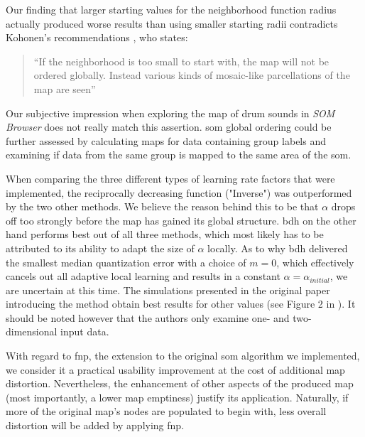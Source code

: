 \smallskip

Our finding that larger starting values for the neighborhood function radius
actually produced worse results than using smaller starting radii contradicts
Kohonen's recommendations \citep{kohonen1990}, who states:

\begin{quotation}
“If the neighborhood is too small to start with, the map will not be ordered
globally. Instead various kinds of mosaic-like parcellations of the map are
seen”
\end{quotation}

Our subjective impression when exploring the map of drum sounds in
\textit{SOM Browser} does not really match this assertion. \gls{som} global
ordering could be further assessed by calculating maps for data containing group
labels and examining if data from the same group is mapped to the same area of
the \gls{som}.

\smallskip

When comparing the three different types of learning rate factors that were
implemented, the reciprocally decreasing function ("Inverse") was outperformed
by the two other methods. We believe the reason behind this to be that $\alpha$
drops off too strongly before the map has gained its global structure. \gls{bdh} on
the other hand performs best out of all three methods, which most likely has to
be attributed to its ability to adapt the size of $\alpha$ locally. As to why
\gls{bdh} delivered the smallest median quantization error with a choice of $m = 0$,
which effectively cancels out all adaptive local learning and results in a
constant $\alpha = \alpha_{initial}$, we are uncertain at this time.
The simulations presented in the original paper introducing the method obtain
best results for other values (see Figure 2 in \citep[p.18]{bauer1996}).
It should be noted however that the authors only examine one- and two-
dimensional input data.

\smallskip

With regard to \gls{fnp}, the extension to the original \gls{som} algorithm we
implemented, we consider it a practical usability improvement at the cost of
additional map distortion. Nevertheless, the enhancement of other aspects of the
produced map (most importantly, a lower map emptiness) justify its application.
Naturally, if more of the original map's nodes are populated to begin with, less
overall distortion will be added by applying \gls{fnp}.

\bigskip

